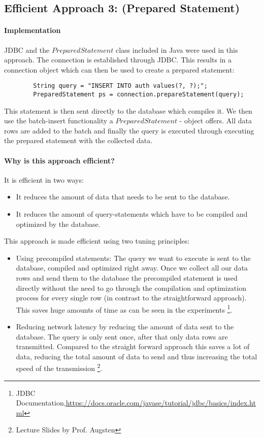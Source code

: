 \documentclass[11pt]{scrartcl}
\begin{document}
    \subsection*{Efficient Approach 3: (Prepared Statement)}

  \paragraph{Implementation}

	JDBC and the $PreparedStatement$ class included in Java were used in this approach. The connection is established through JDBC. This results in a connection object which can then be used to create a prepared statement:
	{\small
	\begin{verbatim}
		String query = "INSERT INTO auth values(?, ?);";
		PreparedStatement ps = connection.prepareStatement(query);
	\end{verbatim}
	}

	This statement is then sent directly to the database which compiles it. We then use the batch-insert functionality a $PreparedStatement$ - object offers. All data rows are added to the batch and finally the query is executed through executing the prepared statement with the collected data.

  \paragraph{Why is this approach efficient?}

  It is efficient in two ways:
  \begin{itemize}
  	\item It reduces the amount of data that needs to be sent to the database.
  	\item It reduces the amount of query-statements which have to be compiled and optimized by the database.
  \end{itemize}

	This approach is made efficient using two tuning principles:
	\begin{itemize}
		\item Using precompiled statements: The query we want to execute is sent to the database, compiled and optimized  right away. Once we collect all our data rows and send them to the database the precompiled statement is used directly without the need to go through the compilation and optimization process for every single row (in contrast to the straightforward approach). This saves huge amounts of time as can be seen in the experiments
        \footnote{JDBC Documentation,\url{https://docs.oracle.com/javase/tutorial/jdbc/basics/index.html}}.
		\item Reducing network latency by reducing the amount of data sent to the database. The query is only sent once, after that only data rows are transmitted. Compared to the straight forward approach this saves a lot of data, reducing the total amount of data to send and thus increasing the total speed of the transmission
        \footnote{Lecture Slides by Prof. Augsten}.
\end{itemize}
\end{document}
